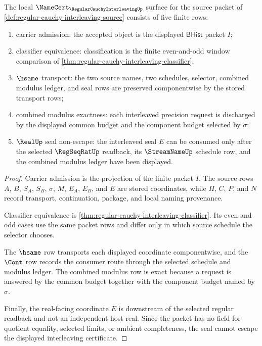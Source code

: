 \begin{theorem}
\label{thm:regular-cauchy-interleaving-namecert-obligations}
The local $\NameCert_{\RegularCauchyInterleavingUp}$ surface for the source packet of \autoref{def:regular-cauchy-interleaving-source} consists of five finite rows:
\begin{enumerate}
\item carrier admission: the accepted object is the displayed $\mathsf{BHist}$ packet $I$;
\item classifier equivalence: classification is the finite even-and-odd window comparison of \autoref{thm:regular-cauchy-interleaving-classifier};
\item $\hsame$ transport: the two source names, two schedules, selector, combined modulus ledger, and seal rows are preserved componentwise by the stored transport rows;
\item combined modulus exactness: each interleaved precision request is discharged by the displayed common budget and the component budget selected by $\sigma$;
\item $\RealUp$ seal non-escape: the interleaved seal $E$ can be consumed only after the selected $\RegSeqRatUp$ readback, its $\StreamNameUp$ schedule row, and the combined modulus ledger have been displayed.
\end{enumerate}
\end{theorem}
\begin{proof}
Carrier admission is the projection of the finite packet $I$. The source rows $A$, $B$, $S_A$, $S_B$, $\sigma$, $M$, $E_A$, $E_B$, and $E$ are stored coordinates, while $H$, $C$, $P$, and $N$ record transport, continuation, package, and local naming provenance.

Classifier equivalence is \autoref{thm:regular-cauchy-interleaving-classifier}. Its even and odd cases use the same packet rows and differ only in which source schedule the selector chooses.

The $\hsame$ row transports each displayed coordinate componentwise, and the $\Cont$ row records the consumer route through the selected schedule and modulus ledger. The combined modulus row is exact because a request is answered by the common budget together with the component budget named by $\sigma$.

Finally, the real-facing coordinate $E$ is downstream of the selected regular readback and not an independent host real. Since the packet has no field for quotient equality, selected limits, or ambient completeness, the seal cannot escape the displayed interleaving certificate.
\end{proof}

